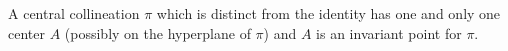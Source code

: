 A central collineation $\pi$ which is distinct from the identity has one and only one center $A$ (possibly on the hyperplane of $\pi$) and $A$ is an invariant point for $\pi$.

